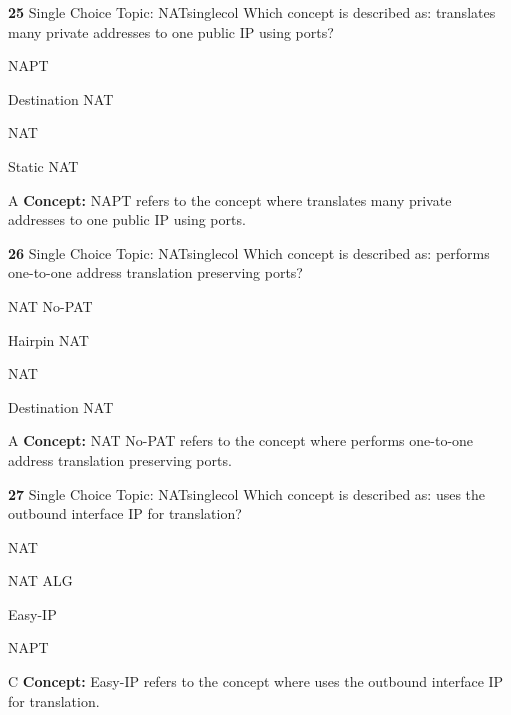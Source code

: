 \documentclass[10pt,a4paper]{article}
\begin{document}
\begin{qcard}{\color{white}\textbf{25} \hfill \small Single Choice \textbar{} Topic: NAT}{singlecol}
Which concept is described as: translates many private addresses to one public IP using ports?

\begin{qoptions}
\item NAPT
\item Destination NAT
\item NAT
\item Static NAT
\end{qoptions}
\begin{explainbox}{A}
\textbf{Concept:} NAPT refers to the concept where translates many private addresses to one public IP using ports.
\end{explainbox}
\end{qcard}

\begin{qcard}{\color{white}\textbf{26} \hfill \small Single Choice \textbar{} Topic: NAT}{singlecol}
Which concept is described as: performs one-to-one address translation preserving ports?

\begin{qoptions}
\item NAT No-PAT
\item Hairpin NAT
\item NAT
\item Destination NAT
\end{qoptions}
\begin{explainbox}{A}
\textbf{Concept:} NAT No-PAT refers to the concept where performs one-to-one address translation preserving ports.
\end{explainbox}
\end{qcard}

\begin{qcard}{\color{white}\textbf{27} \hfill \small Single Choice \textbar{} Topic: NAT}{singlecol}
Which concept is described as: uses the outbound interface IP for translation?

\begin{qoptions}
\item NAT
\item NAT ALG
\item Easy-IP
\item NAPT
\end{qoptions}
\begin{explainbox}{C}
\textbf{Concept:} Easy-IP refers to the concept where uses the outbound interface IP for translation.
\end{explainbox}
\end{qcard}
\end{document}
